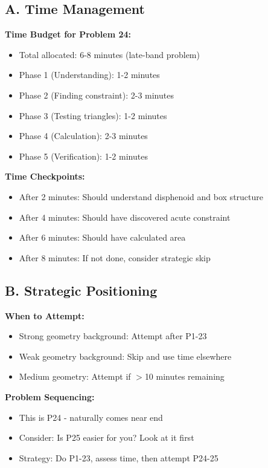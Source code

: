\documentclass[12pt]{article}
\begin{document}
\begin{competitionbox}

\subsection*{A. Time Management}

\textbf{Time Budget for Problem 24:}
\begin{itemize}
    \item Total allocated: 6-8 minutes (late-band problem)
    \item Phase 1 (Understanding): 1-2 minutes
    \item Phase 2 (Finding constraint): 2-3 minutes
    \item Phase 3 (Testing triangles): 1-2 minutes
    \item Phase 4 (Calculation): 2-3 minutes
    \item Phase 5 (Verification): 1-2 minutes
\end{itemize}

\textbf{Time Checkpoints:}
\begin{itemize}
    \item After 2 minutes: Should understand disphenoid and box structure
    \item After 4 minutes: Should have discovered acute constraint
    \item After 6 minutes: Should have calculated area
    \item After 8 minutes: If not done, consider strategic skip
\end{itemize}

\subsection*{B. Strategic Positioning}

\textbf{When to Attempt:}
\begin{itemize}
    \item Strong geometry background: Attempt after P1-23
    \item Weak geometry background: Skip and use time elsewhere
    \item Medium geometry: Attempt if $>$10 minutes remaining
\end{itemize}

\textbf{Problem Sequencing:}
\begin{itemize}
    \item This is P24 - naturally comes near end
    \item Consider: Is P25 easier for you? Look at it first
    \item Strategy: Do P1-23, assess time, then attempt P24-25
\end{itemize}


\end{competitionbox}
\end{document}
